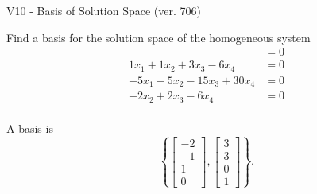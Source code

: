 \begin{exercise}
  \begin{exerciseTitle}V10 - Basis of Solution Space (ver. 706)\end{exerciseTitle}
  \begin{exerciseStatement}
    Find a basis for the solution space of the homogeneous system 
\begin{align*}
 &= 0  \\ 
 1 x_ 1 + 1 x_ 2 + 3 x_ 3 -6 x_ 4 &= 0  \\ 
  -5 x_ 1 -5 x_ 2 -15 x_ 3 + 30 x_ 4 &= 0  \\ 
  + 2 x_ 2 + 2 x_ 3 -6 x_ 4 &= 0  \\ 
 \end{align*}


 
  \end{exerciseStatement}

  \begin{exerciseAnswer}
   A basis is   
\[\left\{\left[\begin{array}{c}
-2 \\
-1 \\
1 \\
0
\end{array}\right] , \left[\begin{array}{c}
3 \\
3 \\
0 \\
1
\end{array}\right]\right\}.\]

  


  \end{exerciseAnswer}
\end{exercise}